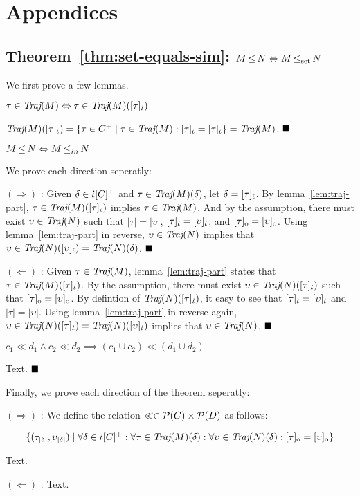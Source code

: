 \section{Appendices}

\subsection{Theorem~\ref{thm:set-equals-sim}: $M \operatorname{\leq} N \Leftrightarrow M \operatorname{\operatorname{\leq}_{\textrm{set}}} N$}

We first prove a few lemmas.

\begin{lemma} \label{lem:traj-part}
$\tau \in \operatorname{\textit{Traj}}(M) \Leftrightarrow \tau \in \operatorname{\textit{Traj}}(M)([\tau]_{\dot{\iota}})$
\end{lemma}

$\operatorname{\textit{Traj}}(M)([\tau]_{\dot{\iota}}) = \{ \tau \in C^{+} \mid \tau \in \operatorname{\textit{Traj}}(M) : [\tau]_{\dot{\iota}} = [\tau]_{\dot{\iota}} \} = \operatorname{\textit{Traj}}(M)$. $\Qed$

\begin{lemma} \label{lem:ref-1-to-2}
$M \operatorname{\leq} N \Leftrightarrow M \operatorname{\leq}_{in} N$
\end{lemma}

We prove each direction seperatly:

$(\Rightarrow)$ : Given $\delta \in \dot{\iota}[C]^{+}$ and $\tau \in \operatorname{\textit{Traj}}(M)(\delta)$, let $\delta = [\tau]_{\dot{\iota}}$. By lemma~\ref{lem:traj-part}, $\tau \in \operatorname{\textit{Traj}}(M)([\tau]_{\dot{\iota}})$ implies $\tau \in \operatorname{\textit{Traj}}(M)$. And by the assumption, there must exist $\upsilon \in \operatorname{\textit{Traj}}(N)$ such that $| \tau | = | \upsilon |$, $[\tau]_{\dot{\iota}} = [\upsilon]_{\dot{\iota}}$, and $[\tau]_{\mathrm{o}} = [\upsilon]_{\mathrm{o}}$. Using lemma~\ref{lem:traj-part} in reverse, $\upsilon \in \operatorname{\textit{Traj}}(N)$ implies that $\upsilon \in \operatorname{\textit{Traj}}(N)([\upsilon]_{\dot{\iota}}) = \operatorname{\textit{Traj}}(N)(\delta)$. $\Qed$

$(\Leftarrow)$ : Given $\tau \in \operatorname{\textit{Traj}}(M)$, lemma~\ref{lem:traj-part} states that $\tau \in \operatorname{\textit{Traj}}(M)([\tau]_{\dot{\iota}})$. By the assumption, there must exist $\upsilon \in \operatorname{\textit{Traj}}(N)([\tau]_{\dot{\iota}})$ such that $[\tau]_{\mathrm{o}} = [\upsilon]_{\mathrm{o}}$. By defintion of $\operatorname{\textit{Traj}}(N)([\tau]_{\dot{\iota}})$, it easy to see that $[\tau]_{\dot{\iota}} = [\upsilon]_{\dot{\iota}}$ and $| \tau | = | \upsilon |$. Using lemma~\ref{lem:traj-part} in reverse again, $\upsilon \in \operatorname{\textit{Traj}}(N)([\tau]_{\dot{\iota}}) = \operatorname{\textit{Traj}}(N)([\upsilon]_{\dot{\iota}})$ implies that $\upsilon \in \operatorname{\textit{Traj}}(N)$. $\Qed$

\begin{lemma} \label{lem:cl-union}
$c_{1} \ll d_{1} \wedge c_{2} \ll d_{2} \implies (c_{1} \cup c_{2}) \ll (d_{1} \cup d_{2})$
\end{lemma}

Text. $\Qed$

Finally, we prove each direction of the theorem seperatly:

$(\Rightarrow)$ : We define the relation $\ll \in \mathcal{P}(C) \times \mathcal{P}(D)$ as follows:

\begin{equation*}
\{ (\tau_{| \delta |}, \upsilon_{| \delta |}) \mid \forall \delta \in \dot{\iota}[C]^{+} : \forall \tau \in \operatorname{\textit{Traj}}(M)(\delta) : \forall \upsilon \in \operatorname{\textit{Traj}}(N)(\delta) : [\tau]_{\mathrm{o}} = [\upsilon]_{\mathrm{o}} \}
\end{equation*}

\noindent Text.

$(\Leftarrow)$ : Text.
